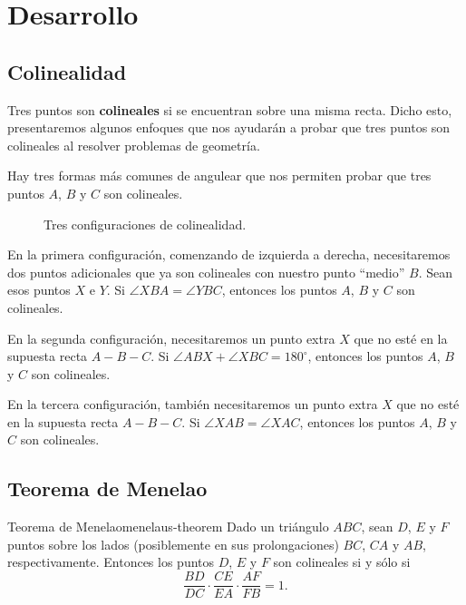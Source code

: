 \section{Desarrollo}




\subsection{Colinealidad}

\begin{figure}[H]
    \centering
    
\end{figure}

Tres puntos son \textbf{colineales} si se encuentran sobre una misma recta.
Dicho esto, presentaremos algunos enfoques que nos ayudarán a probar que tres puntos son colineales al resolver problemas de geometría.

Hay tres formas más comunes de angulear que nos permiten probar que tres puntos $A$, $B$ y $C$ son colineales.

\begin{figure}[H]
    \centering
    
    \caption{Tres configuraciones de colinealidad.}
\end{figure}

En la primera configuración, comenzando de izquierda a derecha, necesitaremos dos puntos adicionales que ya son colineales con nuestro punto ``medio'' $B$.
Sean esos puntos $X$ e $Y$.
Si $\angle XBA = \angle YBC$, entonces los puntos $A$, $B$ y $C$ son colineales.

En la segunda configuración, necesitaremos un punto extra $X$ que no esté en la supuesta recta $A - B - C$.
Si $\angle ABX + \angle XBC = 180^\circ$, entonces los puntos $A$, $B$ y $C$ son colineales.

En la tercera configuración, también necesitaremos un punto extra $X$ que no esté en la supuesta recta $A - B - C$.
Si $\angle XAB = \angle XAC$, entonces los puntos $A$, $B$ y $C$ son colineales.




\subsection{Teorema de Menelao}

\begin{section-theorem.tcb}{Teorema de Menelao}{menelaus-theorem}
    Dado un triángulo $ABC$, sean $D$, $E$ y $F$ puntos sobre los lados (posiblemente en sus prolongaciones) $BC$, $CA$ y $AB$, respectivamente.
    Entonces los puntos $D$, $E$ y $F$ son colineales si y sólo si
    \[
        \frac{BD}{DC} \cdot \frac{CE}{EA} \cdot \frac{AF}{FB} = 1.
    \]
\end{section-theorem.tcb}

